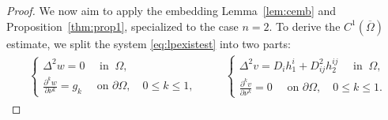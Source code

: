 \documentclass[12pt,a4paper,twoside]{article}
\begin{document}
\begin{proof} We now aim to apply the embedding Lemma~\ref{lem:cemb} and Proposition~\ref{thm:prop1}, specialized to the case $n = 2$.
To derive the $C^1(\overline{\Omega})$ estimate, we split the system \eqref{eq:lpexistest} into two parts:
\begin{align*}
\begin{aligned}
            \begin{cases}
   \Delta^2w = 0  \quad \text{ in } \ \Omega, \\
    \displaystyle\frac{\partial^k w}{\partial \nu^k} = g_k \quad \text{ on } \partial \Omega, \quad 0\le k\le 1,
    \end{cases} 
\end{aligned}
\qquad 
    \begin{cases}
   \Delta^2v =  D_ih^i_1+D^2_{ij}h^{ij}_2 \quad \text{ in }  \ \Omega, \\
    \displaystyle\frac{\partial^k v}{\partial \nu^k} = 0 \quad \text{ on } \partial \Omega, \quad 0\le k\le 1.
    \end{cases} 
\end{align*}


\end{proof}
\end{document}
